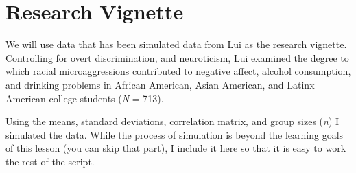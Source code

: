 \documentclass[
  11pt,
]{book}
\begin{document}
\hypertarget{research-vignette}{%
\section{Research Vignette}\label{research-vignette}}

We will use data that has been simulated data from Lui \citeyearpar{lui_racial_2020} as the research vignette. Controlling for overt discrimination, and neuroticism, Lui examined the degree to which racial microaggressions contributed to negative affect, alcohol consumption, and drinking problems in African American, Asian American, and Latinx American college students (\emph{N} = 713).

Using the means, standard deviations, correlation matrix, and group sizes (\emph{n}) I simulated the data. While the process of simulation is beyond the learning goals of this lesson (you can skip that part), I include it here so that it is easy to work the rest of the script.
\end{document}
